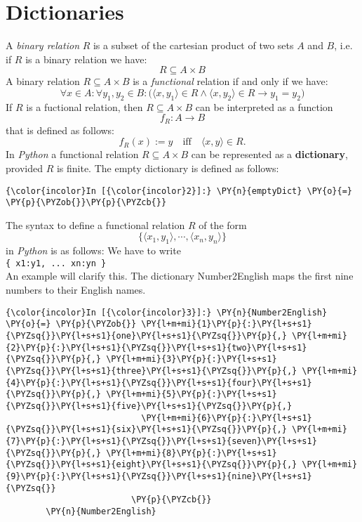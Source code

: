 \section{Dictionaries}\label{dictionaries}

    A \emph{binary relation} \(R\) is a subset of the cartesian product of
two sets \(A\) and \(B\), i.e. if \(R\) is a binary relation we have:
\[ R \subseteq A \times B \] A binary relation
\(R \subseteq A \times B\) is a \emph{functional} relation if and only if
we have: \[ \forall x \in A: \forall y_1, y_2 \in B: \bigl(
     \langle x, y_1\rangle \in R \wedge \langle x, y_2\rangle \in R
     \rightarrow y_1 = y_2
   \bigr)
 \]
 If \(R\) is a fuctional relation, then \(R \subseteq A \times B\) can
be interpreted as a function \[ f_R:A \rightarrow B \] that is defined
as follows:
\[ f_R(x) := y \quad\mbox{iff}\quad \langle x, y\rangle \in R. \]
In \emph{Python} a functional relation \(R \subseteq A \times B\) can be
represented as a \textbf{dictionary}, provided \(R\) is finite. The
empty dictionary is defined as follows:
\begin{Verbatim}[commandchars=\\\{\}]
{\color{incolor}In [{\color{incolor}2}]:} \PY{n}{emptyDict} \PY{o}{=} \PY{p}{\PYZob{}}\PY{p}{\PYZcb{}}
\end{Verbatim}
The syntax to define a functional relation \(R\) of the form
\[ \bigl\{ \langle x_1, y_1\rangle, \cdots, \langle x_n, y_n\rangle \bigr\} \]
in \textsl{Python} is as follows: We have to write
\\[0.2cm]
\hspace*{1.3cm}
\texttt{\{ x1:y1, ... xn:yn \}}
\\[0.2cm]
An example will clarify this. The dictionary Number2English maps the first nine
numbers to their English names.

\begin{Verbatim}[commandchars=\\\{\}]
{\color{incolor}In [{\color{incolor}3}]:} \PY{n}{Number2English} \PY{o}{=} \PY{p}{\PYZob{}} \PY{l+m+mi}{1}\PY{p}{:}\PY{l+s+s1}{\PYZsq{}}\PY{l+s+s1}{one}\PY{l+s+s1}{\PYZsq{}}\PY{p}{,} \PY{l+m+mi}{2}\PY{p}{:}\PY{l+s+s1}{\PYZsq{}}\PY{l+s+s1}{two}\PY{l+s+s1}{\PYZsq{}}\PY{p}{,} \PY{l+m+mi}{3}\PY{p}{:}\PY{l+s+s1}{\PYZsq{}}\PY{l+s+s1}{three}\PY{l+s+s1}{\PYZsq{}}\PY{p}{,} \PY{l+m+mi}{4}\PY{p}{:}\PY{l+s+s1}{\PYZsq{}}\PY{l+s+s1}{four}\PY{l+s+s1}{\PYZsq{}}\PY{p}{,} \PY{l+m+mi}{5}\PY{p}{:}\PY{l+s+s1}{\PYZsq{}}\PY{l+s+s1}{five}\PY{l+s+s1}{\PYZsq{}}\PY{p}{,} 
                           \PY{l+m+mi}{6}\PY{p}{:}\PY{l+s+s1}{\PYZsq{}}\PY{l+s+s1}{six}\PY{l+s+s1}{\PYZsq{}}\PY{p}{,} \PY{l+m+mi}{7}\PY{p}{:}\PY{l+s+s1}{\PYZsq{}}\PY{l+s+s1}{seven}\PY{l+s+s1}{\PYZsq{}}\PY{p}{,} \PY{l+m+mi}{8}\PY{p}{:}\PY{l+s+s1}{\PYZsq{}}\PY{l+s+s1}{eight}\PY{l+s+s1}{\PYZsq{}}\PY{p}{,} \PY{l+m+mi}{9}\PY{p}{:}\PY{l+s+s1}{\PYZsq{}}\PY{l+s+s1}{nine}\PY{l+s+s1}{\PYZsq{}}
                         \PY{p}{\PYZcb{}}
        \PY{n}{Number2English}
\end{Verbatim}


